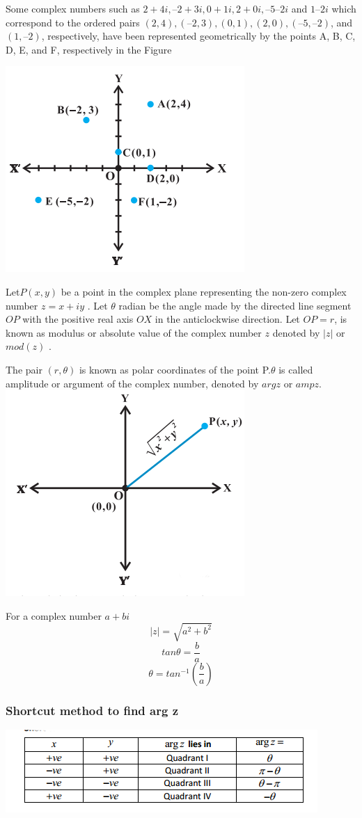 \documentclass{article}
\begin{document}
\begin{multicols}{2}
Some complex numbers such as
$2 + 4i, – 2 + 3i, 0 + 1i, 2 + 0i, – 5 –2i$ and
$1 – 2i$ which correspond to the ordered
pairs $(2, 4), ( – 2, 3), (0, 1), (2, 0), ( –5, –2)$, and $(1, – 2)$, respectively, have been
represented geometrically by the points A, B, C, D, E, and F, respectively in
the Figure

\includegraphics[scale=0.5]{1.png}

Let$ P(x,y)$ be a point in the complex plane representing the non-zero complex number $z = x +iy$ . Let $\theta$ radian
be the angle made by the directed line segment $OP$ with the positive real axis $OX$ in the anticlockwise
direction. Let $OP = r$, is known as modulus or absolute value of the complex number $z$ denoted by
$|z|$ or $mod ( z )$ .

The pair $(r,\theta)$ is known as polar coordinates of the point P.$ \theta$ is called amplitude or argument
of the complex number, denoted by $arg z$ or $amp z $.
\includegraphics[scale=0.5]{2.png}

For a complex number $a+bi$ 
$$|z|=\sqrt{a^2+b^2}$$
$$tan \theta =\frac{b}{a}$$
$$\theta =tan^{-1}(\frac{b}{a})$$

\subsubsection*{Shortcut method to find arg z}
\includegraphics[scale=0.6]{3.png}
\end{multicols}
\end{document}
